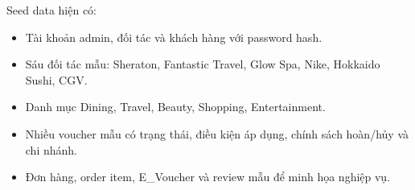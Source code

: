 Seed data hiện có:

\begin{itemize}[leftmargin=1.2cm]
    \item Tài khoản admin, đối tác và khách hàng với password hash.
    \item Sáu đối tác mẫu: Sheraton, Fantastic Travel, Glow Spa, Nike, Hokkaido Sushi, CGV.
    \item Danh mục Dining, Travel, Beauty, Shopping, Entertainment.
    \item Nhiều voucher mẫu có trạng thái, điều kiện áp dụng, chính sách hoàn/hủy và chi nhánh.
    \item Đơn hàng, order item, E\_Voucher và review mẫu để minh họa nghiệp vụ.
\end{itemize}
